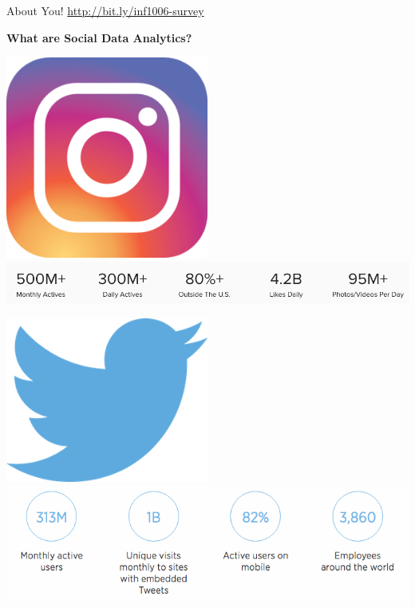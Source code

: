 \documentclass{beamer}
\begin{document}
\begin{frame}{About You!}
  \centering
  \url{http://bit.ly/inf1006-survey}
\end{frame}

\begin{frame}[plain]
  \begin{center}
    \bf \LARGE What are Social Data Analytics?
  \end{center}
\end{frame}

\begin{frame}[plain]
  \begin{center}
      \includegraphics[width=0.5\textwidth]{img/instagram-logo.png} \\
      \includegraphics[width=\textwidth]{img/instagram-stats.png} \\
  \end{center}
\end{frame}

\begin{frame}[plain]
  \begin{center}
      \includegraphics[width=0.5\textwidth]{img/twitter-logo.png} \\
      \includegraphics[width=\textwidth]{img/twitter-stats.png} \\
  \end{center}
\end{frame}
\end{document}

